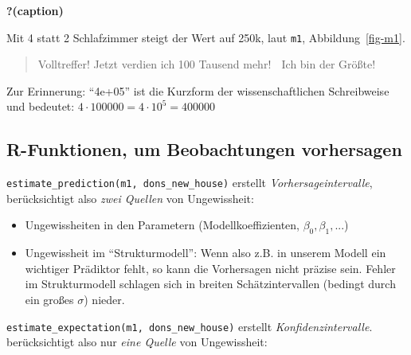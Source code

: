 \documentclass[
  a4paper,
  DIV=11]{scrreprt}
\providecommand{\tightlist}{%
  \setlength{\itemsep}{0pt}\setlength{\parskip}{0pt}}\usepackage{longtable,booktabs,array}
\theoremstyle{definition}
\theoremstyle{remark}
\begin{document}
\begin{table}

\caption{\textbf{?(caption)}}

\end{table}

Mit 4 statt 2 Schlafzimmer steigt der Wert auf 250k, laut \texttt{m1},
Abbildung~\ref{fig-m1}.

\begin{quote}
Volltreffer! Jetzt verdien ich 100 Tausend mehr! 🤑 Ich bin der Größte!
🧑
\end{quote}

\begin{tcolorbox}[enhanced jigsaw, leftrule=.75mm, toptitle=1mm, bottomtitle=1mm, titlerule=0mm, breakable, colframe=quarto-callout-note-color-frame, title=\textcolor{quarto-callout-note-color}{\faInfo}\hspace{0.5em}{Hinweis}, rightrule=.15mm, colback=white, arc=.35mm, left=2mm, bottomrule=.15mm, coltitle=black, opacitybacktitle=0.6, toprule=.15mm, colbacktitle=quarto-callout-note-color!10!white, opacityback=0]
Zur Erinnerung: ``4e+05'' ist die Kurzform der wissenschaftlichen
Schreibweise und bedeutet: \(4 \cdot 100000 = 4\cdot10^5 = 400000\)
\end{tcolorbox}

\hypertarget{r-funktionen-um-beobachtungen-vorhersagen}{%
\subsection{R-Funktionen, um Beobachtungen
vorhersagen}\label{r-funktionen-um-beobachtungen-vorhersagen}}

\texttt{estimate\_prediction(m1,\ dons\_new\_house)} erstellt
\emph{Vorhersageintervalle}, berücksichtigt also \emph{zwei Quellen} von
Ungewissheit:

\begin{itemize}
\tightlist
\item
  Ungewissheiten in den Parametern (Modellkoeffizienten,
  \(\beta_0, \beta_1, ...\))
\item
  Ungewissheit im ``Strukturmodell'': Wenn also z.B. in unserem Modell
  ein wichtiger Prädiktor fehlt, so kann die Vorhersagen nicht präzise
  sein. Fehler im Strukturmodell schlagen sich in breiten
  Schätzintervallen (bedingt durch ein großes \(\sigma\)) nieder.
\end{itemize}

\texttt{estimate\_expectation(m1,\ dons\_new\_house)} erstellt
\emph{Konfidenzintervalle}. berücksichtigt also nur \emph{eine Quelle}
von Ungewissheit:
\end{document}
